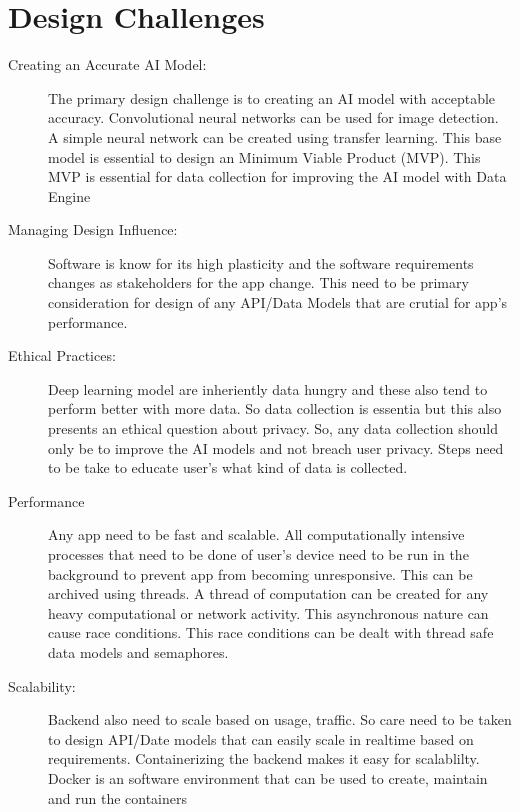 \documentclass[../Report.tex]{subfiles}
\begin{document}
\section{Design Challenges}
\begin{description}
    \item[Creating an Accurate AI Model: ] The primary design challenge is to creating an AI model with acceptable accuracy. Convolutional
    neural networks can be used for image detection. A simple neural network can be created using transfer learning. This base model is 
    essential to design an Minimum Viable Product (MVP). This MVP is essential for data collection for improving the AI model with Data 
    Engine
    
    \item[Managing Design Influence: ] Software is know for its high plasticity and the software requirements changes as stakeholders for
    the app change. This need to be primary consideration for design of any API/Data Models that are crutial for app's performance.

    \item[Ethical Practices: ] Deep learning model are inheriently data hungry and these also tend to perform better with more data. So
    data collection is essentia but this also presents an ethical question about privacy. So, any data collection should only be to 
    improve the AI models and not breach user privacy. Steps need to be take to educate user's what kind of data is collected.

    \item[Performance] Any app need to be fast and scalable. All computationally intensive processes that need to be 
    done of user's device need to be run in the background to prevent app from becoming unresponsive. This can be archived using 
    threads. A thread of computation can be created for any heavy computational or network activity. This asynchronous nature can 
    cause race conditions. This race conditions can be dealt with thread safe data models and semaphores.
    
    \item[Scalability: ]
    Backend also need to scale based on usage, traffic. So care need to be taken to design API/Date models that can easily scale in 
    realtime based on requirements. Containerizing the backend makes it easy for scalablilty. Docker is an software environment that
    can be used to create, maintain and run the containers
\end{description}
\end{document}
